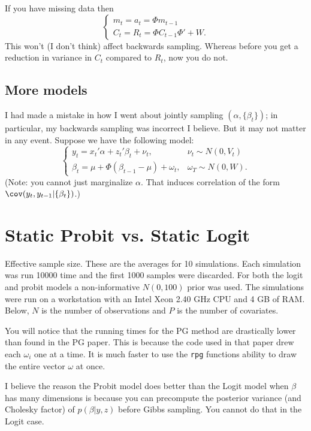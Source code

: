 \documentclass{article}
\begin{document}
If you have missing data then
\[
\begin{cases}
m_t = a_t = \Phi m_{t-1} \\
C_t = R_t = \Phi C_{t-1} \Phi' + W.
\end{cases}
\]
This won't (I don't think) affect backwards sampling.  Whereas before you get a
reduction in variance in $C_t$ compared to $R_t$, now you do not.

\subsection{More models}

I had made a mistake in how I went about jointly sampling $(\alpha,
\{\beta_t\})$; in particular, my backwards sampling was incorrect I believe.
But it may not matter in any event.  Suppose we have the following model:
\[
\begin{cases}
y_t = x_t' \alpha + z_t' \beta_t + \nu_t, & \nu_t \sim N(0, V_t) \\
\beta_t = \mu + \Phi (\beta_{t-1} - \mu) + \omega_t, & \omega_T \sim N(0, W).
\end{cases}
\]
(Note: you cannot just marginalize $\alpha$.  That induces correlation of the
form $\cov(y_t, y_{t-1} | \{\beta_t\})$.)  

\section{Static Probit vs. Static Logit}

Effective sample size.  These are the averages for 10 simulations.  Each
simulation was run 10000 time and the first 1000 samples were discarded.  For
both the logit and probit models a non-informative $N(0, 100)$ prior was used.
The simulations were run on a workstation with an Intel Xeon 2.40 GHz CPU and 4
GB of RAM.  Below, $N$ is the number of observations and $P$ is the number of
covariates.

You will notice that the running times for the PG method are drastically lower
than found in the PG paper.  This is because the code used in that paper drew
each $\omega_i$ one at a time.  It is much faster to use the \texttt{rpg}
functions ability to draw the entire vector $\omega$ at once.

I believe the reason the Probit model does better than the Logit model when
$\beta$ has many dimensions is because you can precompute the posterior variance
(and Cholesky factor) of $p(\beta | y, z)$ before Gibbs sampling.  You cannot do
that in the Logit case.
\end{document}
